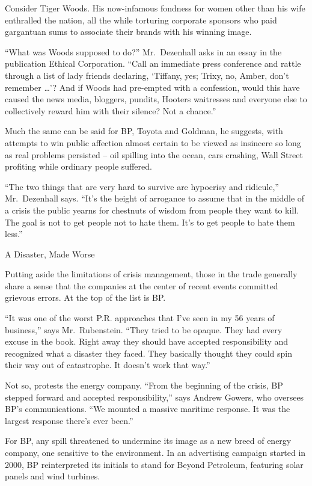 ﻿\documentclass[12pt]{article}
\begin{document}
Consider Tiger Woods. His now-infamous fondness for women other than his wife enthralled the nation,
all the while torturing corporate sponsors who paid gargantuan sums to associate their brands with
his winning image.

``What was Woods supposed to do?'' Mr.~Dezenhall asks in an essay in the publication Ethical
Corporation. ``Call an immediate press conference and rattle through a list of lady friends
declaring, `Tiffany, yes; Trixy, no, Amber, don't remember \ldots'? And if Woods had pre-empted with
a confession, would this have caused the news media, bloggers, pundits, Hooters waitresses and
everyone else to collectively reward him with their silence? Not a chance.''

Much the same can be said for BP, Toyota and Goldman, he suggests, with attempts to win public
affection almost certain to be viewed as insincere so long as real problems persisted -- oil
spilling into the ocean, cars crashing, Wall Street profiting while ordinary people suffered.

``The two things that are very hard to survive are hypocrisy and ridicule,'' Mr.~Dezenhall says.
``It's the height of arrogance to assume that in the middle of a crisis the public yearns for
chestnuts of wisdom from people they want to kill. The goal is not to get people not to hate them.
It's to get people to hate them less.''

A Disaster, Made Worse

Putting aside the limitations of crisis management, those in the trade generally share a sense that
the companies at the center of recent events committed grievous errors. At the top of the list is
BP.

``It was one of the worst P.R. approaches that I've seen in my 56 years of business,'' says
Mr.~Rubenstein. ``They tried to be opaque. They had every excuse in the book. Right away they should
have accepted responsibility and recognized what a disaster they faced. They basically thought they
could spin their way out of catastrophe. It doesn't work that way.''

Not so, protests the energy company. ``From the beginning of the crisis, BP stepped forward and
accepted responsibility,'' says Andrew Gowers, who oversees BP's communications. ``We mounted a
massive maritime response. It was the largest response there's ever been.''

For BP, any spill threatened to undermine its image as a new breed of energy company, one sensitive
to the environment. In an advertising campaign started in 2000, BP reinterpreted its initials to
stand for Beyond Petroleum, featuring solar panels and wind turbines.
\end{document}
